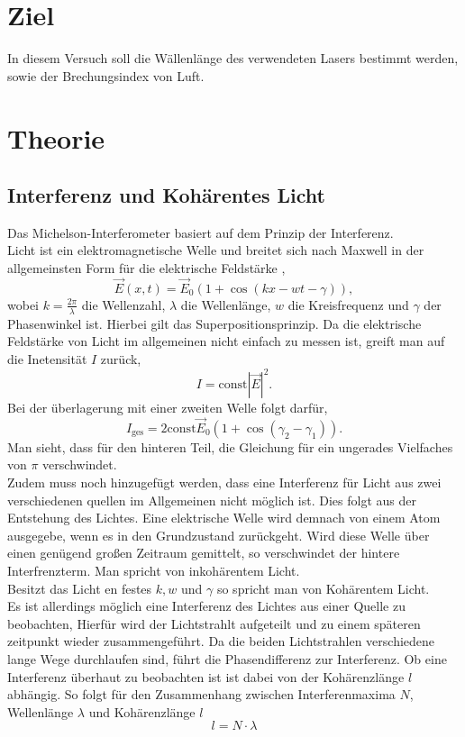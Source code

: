 \section{Ziel}
In diesem Versuch soll die Wällenlänge des verwendeten Lasers bestimmt werden, sowie der Brechungsindex von Luft.
\section{Theorie}
\subsection{Interferenz und Kohärentes Licht}
Das Michelson-Interferometer basiert auf dem Prinzip der Interferenz.\\
Licht ist ein elektromagnetische Welle und breitet sich nach Maxwell in der allgemeinsten Form für die elektrische Feldstärke ,
\begin{equation}
    \vec{E}(x,t)=\vec{E}_0\left(1+\cos (kx-wt-\gamma)\right),
\end{equation}
wobei $k=\frac{2\pi}{\lambda}$ die Wellenzahl, $\lambda$ die Wellenlänge, $w$ die Kreisfrequenz und $\gamma$ der Phasenwinkel ist.
Hierbei gilt das Superpositionsprinzip. Da die elektrische Feldstärke von Licht im allgemeinen nicht 
einfach zu messen ist, greift man auf die Inetensität $I$ zurück,
\begin{equation}
    I=\text{const}|\vec{E}|^2.
\end{equation}
Bei der überlagerung mit einer zweiten Welle folgt darfür,
\begin{equation}
    I_{\text{ges}}=2\text{const}\vec{E}_0(1+\cos (\gamma_2-\gamma_1)).
\end{equation}
Man sieht, dass für den hinteren Teil, die Gleichung für ein ungerades Vielfaches von $\pi$ verschwindet.\\

Zudem muss noch hinzugefügt werden, dass eine Interferenz für Licht aus zwei verschiedenen quellen im Allgemeinen nicht möglich ist.
Dies folgt aus der Entstehung des Lichtes. Eine elektrische Welle wird demnach von einem Atom ausgegebe, wenn es in den Grundzustand zurückgeht.
Wird diese Welle über einen genügend großen Zeitraum gemittelt, so verschwindet der hintere Interfrenzterm.
Man spricht von inkohärentem Licht.\\
Besitzt das Licht en festes $k, w$ und $\gamma$ so spricht man von Kohärentem Licht.\\


Es ist allerdings möglich eine Interferenz des Lichtes aus einer Quelle zu beobachten, Hierfür wird
der Lichtstrahlt aufgeteilt und zu einem späteren zeitpunkt wieder zusammengeführt.
Da die beiden Lichtstrahlen verschiedene lange Wege durchlaufen sind, führt die Phasendifferenz zur Interferenz.
Ob eine Interferenz überhaut zu beobachten ist ist dabei von der Kohärenzlänge $l$ abhängig.
So folgt für den Zusammenhang zwischen Interferenmaxima $N$, Wellenlänge $\lambda$ 
und Kohärenzlänge $l$
\begin{equation}
    l=N\cdot\lambda
\end{equation}

